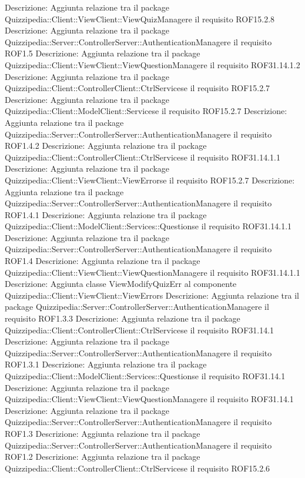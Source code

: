 Descrizione: Aggiunta relazione tra il package Quizzipedia::Client::ViewClient::ViewQuizManagere il requisito ROF15.2.8 
Descrizione: Aggiunta relazione tra il package Quizzipedia::Server::ControllerServer::AuthenticationManagere il requisito ROF1.5 
Descrizione: Aggiunta relazione tra il package Quizzipedia::Client::ViewClient::ViewQuestionManagere il requisito ROF31.14.1.2 
Descrizione: Aggiunta relazione tra il package Quizzipedia::Client::ControllerClient::CtrlServicese il requisito ROF15.2.7 
Descrizione: Aggiunta relazione tra il package Quizzipedia::Client::ModelClient::Servicese il requisito ROF15.2.7 
Descrizione: Aggiunta relazione tra il package Quizzipedia::Server::ControllerServer::AuthenticationManagere il requisito ROF1.4.2 
Descrizione: Aggiunta relazione tra il package Quizzipedia::Client::ControllerClient::CtrlServicese il requisito ROF31.14.1.1 
Descrizione: Aggiunta relazione tra il package Quizzipedia::Client::ViewClient::ViewErrorse il requisito ROF15.2.7 
Descrizione: Aggiunta relazione tra il package Quizzipedia::Server::ControllerServer::AuthenticationManagere il requisito ROF1.4.1 
Descrizione: Aggiunta relazione tra il package Quizzipedia::Client::ModelClient::Services::Questionse il requisito ROF31.14.1.1 
Descrizione: Aggiunta relazione tra il package Quizzipedia::Server::ControllerServer::AuthenticationManagere il requisito ROF1.4 
Descrizione: Aggiunta relazione tra il package Quizzipedia::Client::ViewClient::ViewQuestionManagere il requisito ROF31.14.1.1 
Descrizione: Aggiunta classe ViewModifyQuizErr al componente Quizzipedia::Client::ViewClient::ViewErrors 
Descrizione: Aggiunta relazione tra il package Quizzipedia::Server::ControllerServer::AuthenticationManagere il requisito ROF1.3.3 
Descrizione: Aggiunta relazione tra il package Quizzipedia::Client::ControllerClient::CtrlServicese il requisito ROF31.14.1 
Descrizione: Aggiunta relazione tra il package Quizzipedia::Server::ControllerServer::AuthenticationManagere il requisito ROF1.3.1 
Descrizione: Aggiunta relazione tra il package Quizzipedia::Client::ModelClient::Services::Questionse il requisito ROF31.14.1 
Descrizione: Aggiunta relazione tra il package Quizzipedia::Client::ViewClient::ViewQuestionManagere il requisito ROF31.14.1 
Descrizione: Aggiunta relazione tra il package Quizzipedia::Server::ControllerServer::AuthenticationManagere il requisito ROF1.3 
Descrizione: Aggiunta relazione tra il package Quizzipedia::Server::ControllerServer::AuthenticationManagere il requisito ROF1.2 
Descrizione: Aggiunta relazione tra il package Quizzipedia::Client::ControllerClient::CtrlServicese il requisito ROF15.2.6 
